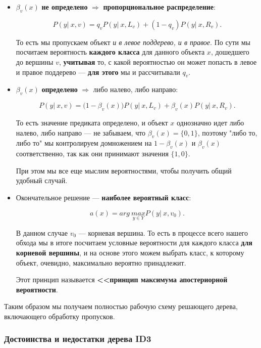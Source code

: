 \documentclass{article}
\begin{document}
\begin{enumerate}
	\begin{itemize}
	\item $\beta_v(x)$ \textbf{не определено} $\Rightarrow$ \textbf{пропорциональное распределение}:
	
	$$P(y |\ x,v) = q_v P(y|\ x, L_v) + (1 - q_v) P(y|\ x, R_v).$$
	
	То есть мы пропускаем объект \textit{и в левое поддерево, и в правое}. По сути мы посчитаем вероятность \textbf{каждого класса} для данного объекта $x$, дошедшего до вершины $v$, \textbf{учитывая} то, с какой вероятностью он может попасть в левое и правое поддерево --- \textbf{для этого} мы и рассчитывали $q_v$.
	
	\item $\beta_v(x)$ \textbf{определено} $\Rightarrow$ либо налево, либо направо:
	
	$$P(y|\ x, v) = \bigl(1 - \beta_v(x)\bigr)P(y|\ x, L_v) + \beta_v(x)P(y|\ x, R_v).$$
	
	То есть значение предиката определено, и объект $x$ однозначно идет либо налево, либо направо --- не забываем, что $\beta_v(x) = \{0, 1\}$, поэтому "либо то, либо то" мы контролируем домножением на $1 - \beta_v(x)$ и $\beta_v(x)$ соответственно, так как они принимают значения $\{1,0\}$. 
	
	При этом мы все еще мыслим вероятностями, чтобы получить общий удобный случай.
	
	\item Окончательное решение --- \textbf{наиболее вероятный класс}:
	
	$$a(x) = arg\ \underset{y\in Y}{max}P(y|\ x, v_0).$$
	
	В данном случае $v_0$ --- корневая вершина. То есть в процессе всего нашего обхода мы в итоге посчитаем условные вероятности для каждого класса \textbf{для корневой вершины}, и на основе этого можем выбрать класс, к которому объект, очевидно, максимально вероятно принадлежит.
	
	Этот принцип называется \textbf{<<принцип максимума апостериорной вероятности}.
	
	\end{itemize}
\end{enumerate}

Таким образом мы получаем полностью рабочую схему решающего дерева, включающего обработку пропусков.

\subsubsection{Достоинства и недостатки дерева ID3}
\end{document}
